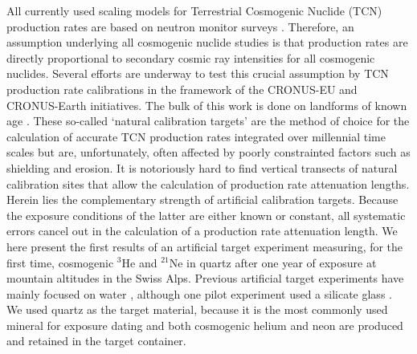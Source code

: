 \documentclass{article}
\begin{document}
All currently  used scaling models for  Terrestrial Cosmogenic Nuclide
(TCN)  production   rates  are   based  on  neutron   monitor  surveys
\citep{lal1991,   stone2000,   dunai2000,   dunai2001,   desilets2003,
  pigati2004,  lifton2008}.  Therefore,  an assumption  underlying all
cosmogenic  nuclide  studies is  that  production  rates are  directly
proportional to  secondary cosmic  ray intensities for  all cosmogenic
nuclides.   Several   efforts  are  underway  to   test  this  crucial
assumption by TCN production rate calibrations in the framework of the
CRONUS-EU and CRONUS-Earth initiatives.  The bulk of this work is done
on  landforms  of known  age  \citep{desilets2006b}.  These  so-called
`natural  calibration  targets'  are  the  method of  choice  for  the
calculation   of  accurate  TCN   production  rates   integrated  over
millennial  time  scales but  are,  unfortunately,  often affected  by
poorly  constrainted factors  such as  shielding and  erosion.   It is
notoriously  hard to  find vertical  transects of  natural calibration
sites  that  allow  the  calculation of  production  rate  attenuation
lengths.   Herein  lies   the  complementary  strength  of  artificial
calibration targets. Because the exposure conditions of the latter are
either  known or  constant, all  systematic errors  cancel out  in the
calculation of a production  rate attenuation length.  We here present
the first  results of an  artificial target experiment  measuring, for
the first  time, cosmogenic $^3$He  and $^{21}$Ne in quartz  after one
year of  exposure at mountain  altitudes in the Swiss  Alps.  Previous
artificial   target   experiments  have   mainly   focused  on   water
\citep{lal1960,  nishiizumi1996, graham2000, brown2000},  although one
pilot  experiment used  a  silicate glass  \citep{graf1996}.  We  used
quartz as  the target material, because  it is the  most commonly used
mineral for  exposure dating and  both cosmogenic helium and  neon are
produced and retained in the target container.
\\
\end{document}
